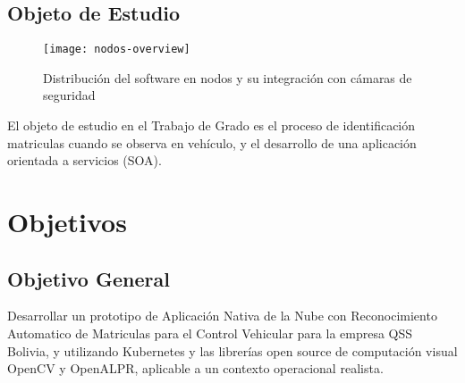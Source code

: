     \subsection{Objeto de Estudio}
        \begin{figure}[h]
            \centering
            \texttt{[image: nodos-overview]}
            \caption{Distribución del software en nodos y su integración con cámaras de seguridad}
            \label{fig:components-abstract}
        \end{figure}
        El objeto de estudio en el Trabajo de Grado es el proceso de identificación matriculas cuando se observa en vehículo, y el desarrollo de una aplicación orientada a servicios (SOA).

\section{Objetivos}

    \subsection{Objetivo General}
    Desarrollar un prototipo de Aplicación Nativa de la Nube con Reconocimiento Automatico de Matriculas para el Control Vehicular para la empresa QSS Bolivia, y utilizando Kubernetes y las librerías open source de computación visual OpenCV  y OpenALPR, aplicable a un contexto operacional realista.
